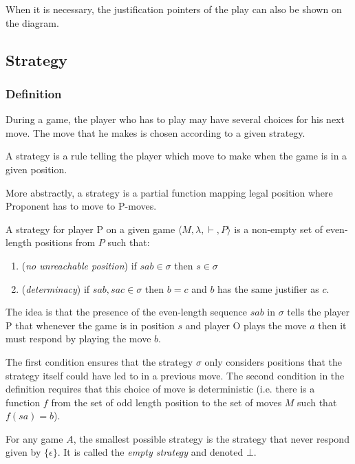 When it is necessary, the justification pointers of the play can also
be shown on the diagram.


\subsection{Strategy}

\subsubsection{Definition}

During a game, the player who has to play may have several choices
for his next move. The move that he makes is chosen according to a
given strategy.

A strategy is a rule telling the player which move to make when the
game is in a given position.

More abstractly, a strategy is a
partial function mapping legal position where Proponent has to move
to P-moves.

\begin{dfn}[Strategy]
\label{dfn:strategy}
A strategy for player P on a given game $\langle M, \lambda, \vdash, P \rangle$ is a
non-empty set of even-length positions from $P$ such that:
\begin{enumerate}
\item (\emph{no unreachable position}) if $sab \in \sigma$ then $s \in \sigma$
\item (\emph{determinacy}) if $sab, sac \in \sigma$ then $b = c$  and $b$ has the same justifier as
$c$.
\end{enumerate}
\end{dfn}

The idea is that the presence of the even-length sequence $s a b$ in
$\sigma$ tells the player P that whenever the game is in position
$s$ and player O plays the move $a$ then it must respond by playing
the move $b$.

The first condition ensures that the strategy $\sigma$ only
considers positions that the strategy itself could have led to in a
previous move. The second condition in the definition requires that
this choice of move is deterministic (i.e. there is a function $f$
from the set of odd length position to the set of moves $M$ such
that $f(s a) = b$).


For any game $A$, the smallest possible strategy is the strategy
that never respond given by $\{ \epsilon \}$. It is called the
\emph{empty strategy} and denoted $\bot$.


